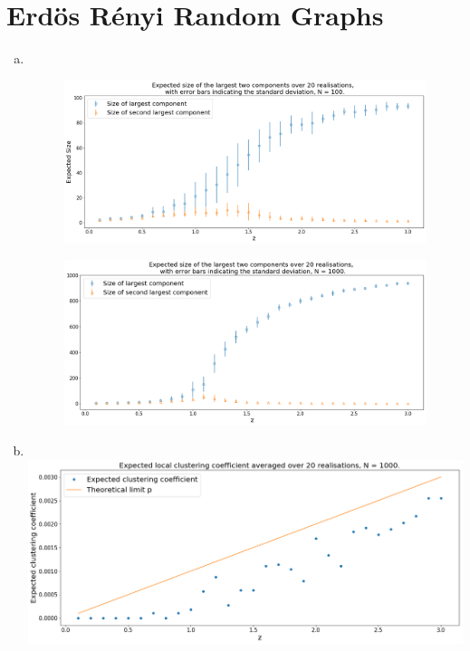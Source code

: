 \documentclass[12pt, twoside, a4paper]{article}
\begin{document}
\section{Erd\"os R\'enyi Random Graphs}
\begin{enumerate}[a)]
\item 
\text{}\\

\begin{figure}[h]
\hspace*{-1.2cm}
\includegraphics[width = 190mm]{lc100}
\end{figure}


\begin{figure}[h]
	\hspace*{-1.2cm}
	\includegraphics[width = 190mm]{lc1000}
	\end{figure}

\vspace{100mm}

\item
\text{}\\
\hspace*{-2cm}
\includegraphics[width = 190mm]{clustering}


\end{enumerate}
\end{document}
